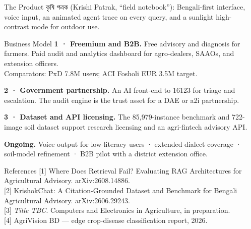 \documentclass[final]{beamer}
\newcommand{\bn}[1]{{\bengalifont #1}}
\newlength{\sepwidth}\setlength{\sepwidth}{0.018\paperwidth}
\newlength{\colwidth}\setlength{\colwidth}{0.17835\paperwidth}
\newcommand{\separatorcolumn}{\begin{column}{\sepwidth}\end{column}}
\newcommand{\Nbench}{85{,}979}
\newcommand{\SoilPhotos}{722}
\newcommand{\Krishi}{16123}
\begin{document}
\begin{frame}[t]
\begin{columns}[t]
\begin{column}{\colwidth}
\begin{block}{The Product}
    {\footnotesize \bn{কৃষি পত্রক} (Krishi Patrak, ``field notebook''):
    Bengali-first interface, voice input, an animated agent trace on every
    query, and a sunlight high-contrast mode for outdoor use.}
    \vspace{0.5ex}
  \end{block}



  \begin{exampleblock}{Business Model}
    \textbf{1 · Freemium and B2B.} Free advisory and diagnosis for farmers.
    Paid audit and analytics dashboard for agro-dealers, SAAOs, and extension
    officers.\\
    {\footnotesize Comparators: PxD 7.8M users; ACI Fosholi EUR 3.5M target.}

    \textbf{2 · Government partnership.} An AI front-end to \Krishi{} for
    triage and escalation. The audit engine is the trust asset for a DAE or
    a2i partnership.

    \textbf{3 · Dataset and API licensing.} The \Nbench-instance benchmark and
    \SoilPhotos-image soil dataset support research licensing and an agri-fintech
    advisory API.

    \textbf{Ongoing.} Voice output for low-literacy users · extended dialect
    coverage · soil-model refinement · B2B pilot with a district extension
    office.
  \end{exampleblock}

  \begin{block}{References}
    {\footnotesize
    [1] Where Does Retrieval Fail? Evaluating RAG Architectures for
    Agricultural Advisory. arXiv:2608.14886.\\{}
    [2] KrishokChat: A Citation-Grounded Dataset and Benchmark for Bengali
    Agricultural Advisory. arXiv:2606.29243.\\{}
    [3] \textit{Title TBC}. Computers and Electronics in Agriculture,
    in preparation.\\{}
    [4] AgriVision BD --- edge crop-disease classification report, 2026.}
  \end{block}

\end{column}

\separatorcolumn
\end{columns}
\end{frame}
\end{document}
